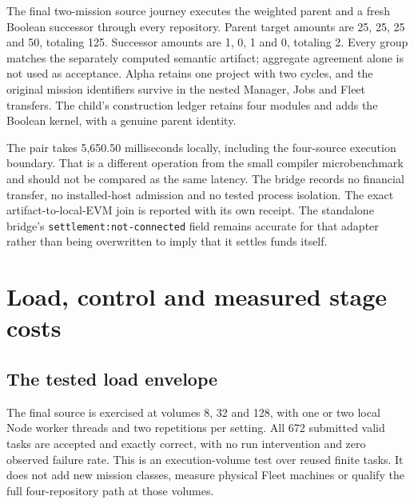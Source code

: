 \documentclass[11pt]{article}
\begin{document}
The final two-mission source journey executes the weighted parent and a fresh Boolean successor through every repository. Parent target amounts are 25, 25, 25 and 50, totaling 125. Successor amounts are 1, 0, 1 and 0, totaling 2. Every group matches the separately computed semantic artifact; aggregate agreement alone is not used as acceptance. Alpha retains one project with two cycles, and the original mission identifiers survive in the nested Manager, Jobs and Fleet transfers. The child's construction ledger retains four modules and adds the Boolean kernel, with a genuine parent identity.

The pair takes 5,650.50 milliseconds locally, including the four-source execution boundary. That is a different operation from the small compiler microbenchmark and should not be compared as the same latency. The bridge records no financial transfer, no installed-host admission and no tested process isolation. The exact artifact-to-local-EVM join is reported with its own receipt. The standalone bridge's \texttt{settlement:not-connected} field remains accurate for that adapter rather than being overwritten to imply that it settles funds itself.



\section{Load, control and measured stage costs}

\subsection{The tested load envelope}

The final source is exercised at volumes 8, 32 and 128, with one or two local Node worker threads and two repetitions per setting. All 672 submitted valid tasks are accepted and exactly correct, with no run intervention and zero observed failure rate. This is an execution-volume test over reused finite tasks. It does not add new mission classes, measure physical Fleet machines or qualify the full four-repository path at those volumes.
\end{document}
